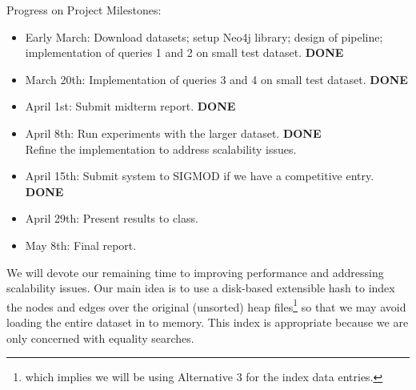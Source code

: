 \documentclass{article}
\begin{document}
Progress on Project Milestones:
\begin{itemize}
\item Early March: Download datasets; setup Neo4j library;
  design of pipeline; implementation of queries 1 and 2 on small test dataset. \textbf{DONE}
\item March 20th: Implementation of queries 3 and 4 on small test dataset. \textbf{DONE}
\item April 1st: Submit midterm report. \textbf{DONE}
\item April 8th:  Run experiments with the larger dataset. \textbf{DONE} \\Refine the implementation to address scalability issues.
\item April 15th: Submit system to SIGMOD if we have a competitive entry. \textbf{DONE}
\item April 29th: Present results to class.
\item May 8th: Final report.
\end{itemize}

We will devote our remaining time to improving performance and
addressing scalability issues.  Our main idea is to use a disk-based
extensible hash to index the nodes and edges over the original
(unsorted) heap files\footnote{which implies we will be using
  Alternative 3 for the index data entries.} so that we may avoid
loading the entire dataset in to memory.  This index is appropriate
because we are only concerned with equality searches.



\end{document}

